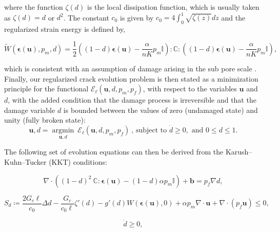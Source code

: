 where the function $\zeta(d)$ is the local dissipation function, which is usually taken as $\zeta(d) = d$ or $d^2$. The constant $c_0$ is given by $c_0 = 4\int_0^1 \sqrt{\zeta(z)}dz$ and the regularized strain energy is defined by,

\begin{equation}\label{damaged strain energy}
    \widetilde{W}(\boldsymbol{\epsilon}(\textbf{u}), p_m, d) = \dfrac{1}{2}\left( (1-d)\boldsymbol\epsilon(\textbf{u}) - \dfrac{\alpha}{nK} p_m\mathbb{I}\right) : \mathbb{C} : \left( (1-d)\boldsymbol\epsilon(\textbf{u}) - \dfrac{\alpha}{nK} p_m\mathbb{I}\right),
\end{equation}

which is consistent with an assumption of damage arising in the sub pore scale \cite{chukwudozie2019variational}. Finally, our regularized crack evolution problem is then stated as a minimization principle for the functional $\mathcal{E}_{\ell}(\textbf{u},d,p_m,p_f)$, with respect to the variables $\textbf{u}$ and $d$, with the added condition that the damage process is irreversible and that the damage variable $d$ is bounded between the values of zero (undamaged state) and unity (fully broken state):
\begin{equation}\label{variational formulation of phase-field}
    \textbf{u}, d = \underset{\textbf{u},d}{{\operatorname{argmin}}} \ \mathcal{E}_{\ell}(\textbf{u},d,p_m,p_f)\ \text{,\ \   subject to } \dot{d} \ge 0, \text{ and } 0 \le d \le 1. 
\end{equation}

The following set of evolution equations can then be derived from the Karush–Kuhn–Tucker (KKT) \cite{karush1939minima, kuhn1951nonlinear} conditions:

\begin{equation}\label{basic u problem}
    \nabla \cdot \left( (1-d)^2\ \mathbb{C}:\boldsymbol\epsilon(\textbf{u}) -(1-d)\alpha p_m \mathbb{I}\right) + \textbf{b} = p_f\nabla d, 
\end{equation}

\begin{equation}\label{damage equation ch3}
    S_d \coloneqq  \dfrac{2G_c\ell}{c_0}\Delta d - \dfrac{G_c}{c_0\ell}\zeta'(d)-g'(d)W(\boldsymbol{\epsilon}(\boldsymbol{\textbf{u}}),0) + \alpha p_m\nabla \cdot \textbf{u} + \nabla \cdot (p_f\textbf{u}) \le 0,
\end{equation}

\begin{equation}
    \dot{d} \ge 0,
\end{equation}

